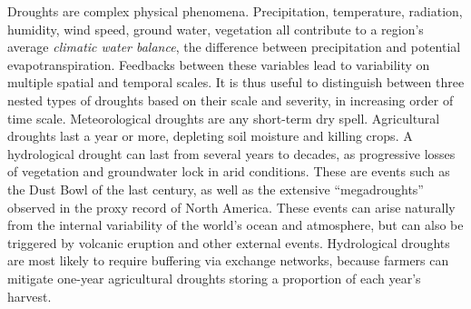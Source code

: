 \documentclass[fleqn,10pt]{wlscirep}
\begin{document}
Droughts are complex physical phenomena. Precipitation, temperature, radiation, humidity, wind speed, ground water, vegetation all contribute to a region's average \textit{climatic water balance}, the difference between precipitation and potential evapotranspiration. Feedbacks between these variables lead to variability on multiple spatial and temporal scales. It is thus useful to distinguish between three nested types of droughts based on their scale and severity, in increasing order of time scale. Meteorological droughts are any short-term dry spell. Agricultural droughts last a year or more, depleting soil moisture and killing crops. A hydrological drought can last from several years to decades, as progressive losses of vegetation and groundwater lock in arid conditions. These are events such as the Dust Bowl of the last century, as well as the extensive ``megadroughts'' observed in the proxy record of North America. These events can arise naturally from the internal variability of the world's ocean and atmosphere, but can also be triggered by volcanic eruption and other external events. Hydrological droughts are most likely to require buffering via exchange networks, because farmers can mitigate one-year agricultural droughts storing a proportion of each year’s harvest.
\end{document}
